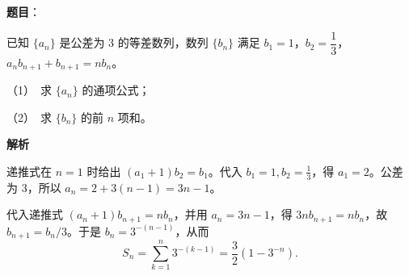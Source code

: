 \begin{answer}

\textbf{题目}：

已知 \(\{a_n\}\) 是公差为 3 的等差数列，数列 \(\{b_n\}\) 满足 \(b_1=1\)，\(b_2=\dfrac{1}{3}\)，\(a_nb_{n+1}+b_{n+1}=nb_n\)。

   （1）　求 \(\{a_n\}\) 的通项公式；

   （2）　求 \(\{b_n\}\) 的前 \(n\) 项和。

\textbf{解析}


递推式在 \(n=1\) 时给出 \((a_1+1)b_2=b_1\)。代入 \(b_1=1,b_2=\frac13\)，得 \(a_1=2\)。公差为 \(3\)，所以 \(a_n=2+3(n-1)=3n-1\)。


代入递推式 \((a_n+1)b_{n+1}=nb_n\)，并用 \(a_n=3n-1\)，得 \(3nb_{n+1}=nb_n\)，故 \(b_{n+1}=b_n/3\)。于是 \(b_n=3^{-(n-1)}\)，从而
\nopagebreak[4]
\[
S_n=\sum_{k=1}^n3^{-(k-1)}=\frac32(1-3^{-n}).
\]



\end{answer}
